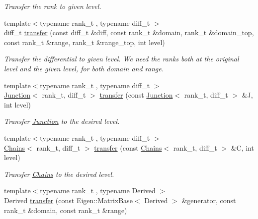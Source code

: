 \begin{DoxyCompactItemize}
\begin{DoxyCompactList}\small\item\em Transfer the rank to given level. \end{DoxyCompactList}\item 
{\footnotesize template$<$typename rank\+\_\+t , typename diff\+\_\+t $>$ }\\diff\+\_\+t \hyperlink{namespaceMackey_ad7524839b58c80d4b2c54827e4833b12}{transfer} (const diff\+\_\+t \&diff, const rank\+\_\+t \&domain, rank\+\_\+t \&domain\+\_\+top, const rank\+\_\+t \&range, rank\+\_\+t \&range\+\_\+top, int level)
\begin{DoxyCompactList}\small\item\em Transfer the differential to given level. We need the ranks both at the original level and the given level, for both domain and range. \end{DoxyCompactList}\item 
{\footnotesize template$<$typename rank\+\_\+t , typename diff\+\_\+t $>$ }\\\hyperlink{classMackey_1_1Junction}{Junction}$<$ rank\+\_\+t, diff\+\_\+t $>$ \hyperlink{namespaceMackey_a914aba7f868e67ae3fd9da3995678660}{transfer} (const \hyperlink{classMackey_1_1Junction}{Junction}$<$ rank\+\_\+t, diff\+\_\+t $>$ \&J, int level)
\begin{DoxyCompactList}\small\item\em Transfer \hyperlink{classMackey_1_1Junction}{Junction} to the desired level. \end{DoxyCompactList}\item 
{\footnotesize template$<$typename rank\+\_\+t , typename diff\+\_\+t $>$ }\\\hyperlink{classMackey_1_1Chains}{Chains}$<$ rank\+\_\+t, diff\+\_\+t $>$ \hyperlink{namespaceMackey_a50837580391b5c6705e23c637d742b22}{transfer} (const \hyperlink{classMackey_1_1Chains}{Chains}$<$ rank\+\_\+t, diff\+\_\+t $>$ \&C, int level)
\begin{DoxyCompactList}\small\item\em Transfer \hyperlink{classMackey_1_1Chains}{Chains} to the desired level. \end{DoxyCompactList}\item 
{\footnotesize template$<$typename rank\+\_\+t , typename Derived $>$ }\\Derived \hyperlink{namespaceMackey_a0550bf97e47b3c319cb5e1bd81008d89}{transfer} (const Eigen\+::\+Matrix\+Base$<$ Derived $>$ \&generator, const rank\+\_\+t \&domain, const rank\+\_\+t \&range)

\end{DoxyCompactItemize}

